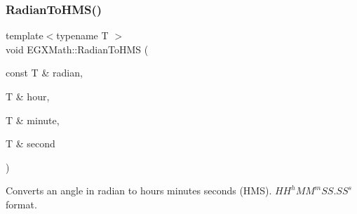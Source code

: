 \mbox{\label{group___e_g_x_math-_angle_conversions-_radian_ga55b5fba9307f34ab8db57391789a90cc}} 
\subsubsection{\texorpdfstring{Radian\+To\+H\+M\+S()}{RadianToHMS()}}
{\footnotesize\ttfamily template$<$typename T $>$ \\
void E\+G\+X\+Math\+::\+Radian\+To\+H\+MS (\begin{DoxyParamCaption}\item[{const T \&}]{radian,  }\item[{T \&}]{hour,  }\item[{T \&}]{minute,  }\item[{T \&}]{second }\end{DoxyParamCaption})}



Converts an angle in radian to hours minutes seconds (H\+MS). ${HH}^h{MM}^m{SS.SS}^s$ format. 

